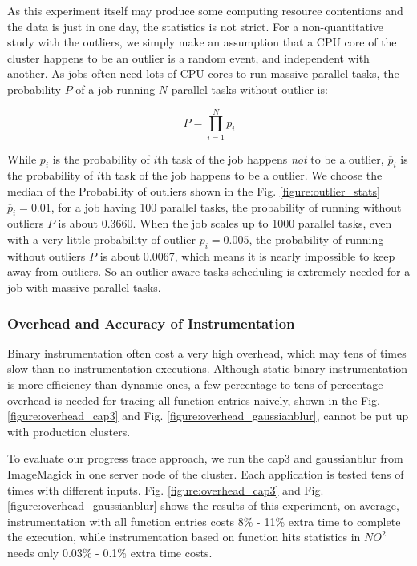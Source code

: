 As this experiment itself may produce some computing resource contentions and the data is just in one day, the statistics is not strict. For a non-quantitative study with the outliers, we simply make an assumption that a CPU core of the cluster happens to be an outlier is a random event, and independent with another. As jobs often need lots of CPU cores to run massive parallel tasks, the probability $P$ of a job running $N$ parallel tasks without outlier is:

$$P = \prod_{i=1}^N p_i$$

While $p_i$ is the probability of $i$th task of the job happens \emph{not} to be a outlier, $\overline{p}_i$ is the probability of $i$th task of the job happens to be a outlier. We choose the median of the Probability of outliers shown in the Fig. \ref{figure:outlier_stats} $\overline{p}_i = 0.01$, for a job having 100 parallel tasks, the probability of running without outliers $P$ is about 0.3660. When the job scales up to 1000 parallel tasks, even with a very little probability of outlier $\overline{p}_i = 0.005$, the probability of running without outliers $P$ is about 0.0067, which means it is nearly impossible to keep away from outliers. So an outlier-aware tasks scheduling is extremely needed for a job with massive parallel tasks.

\subsubsection{Overhead and Accuracy of Instrumentation}

Binary instrumentation often cost a very high overhead, which may tens of times slow than no instrumentation executions. Although static binary instrumentation is more efficiency than dynamic ones, a few percentage to tens of percentage overhead is needed for tracing all function entries naively, shown in the Fig. \ref{figure:overhead_cap3} and Fig. \ref{figure:overhead_gaussianblur}, cannot be put up with production clusters.

To evaluate our progress trace approach, we run the cap3 and gaussianblur from ImageMagick in one server node of the cluster. Each application is tested tens of times with different inputs. Fig. \ref{figure:overhead_cap3} and Fig. \ref{figure:overhead_gaussianblur} shows the results of this experiment, on average, instrumentation with all function entries costs 8\% - 11\% extra time to complete the execution, while instrumentation based on function hits statistics in $NO^2$ needs only 0.03\% - 0.1\% extra time costs.


